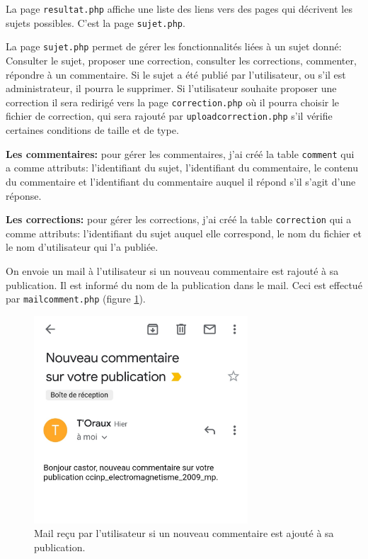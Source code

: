 \documentclass{article}
\begin{document}
La page \texttt{resultat.php} affiche une liste des liens vers des pages qui décrivent les sujets possibles. C'est la page \texttt{sujet.php}.

La page \texttt{sujet.php} permet de gérer les fonctionnalités liées à un sujet donné: Consulter le sujet, proposer une correction, consulter les corrections, commenter, répondre à un commentaire. Si le sujet a été publié par l'utilisateur, ou s'il est administrateur, il pourra le supprimer. Si l'utilisateur souhaite proposer une correction il sera redirigé vers la page \texttt{correction.php} où il pourra choisir le fichier de correction, qui sera rajouté par \texttt{uploadcorrection.php} s'il vérifie certaines conditions de taille et de type.

\textbf{Les commentaires:} pour gérer les commentaires, j'ai créé la table \texttt{comment} qui a comme attributs: l'identifiant du sujet, l'identifiant du commentaire, le contenu du commentaire et l'identifiant du commentaire auquel il répond s'il s'agit d'une réponse.

\textbf{Les corrections:} pour gérer les corrections, j'ai créé la table \texttt{correction} qui a comme attributs: l'identifiant du sujet auquel elle correspond, le nom du fichier et le nom d'utilisateur qui l'a publiée.

On envoie un mail à l'utilisateur si un nouveau commentaire est rajouté à sa publication. Il est informé du nom de la publication dans le mail. Ceci est effectué par \texttt{mailcomment.php} (figure \ref{mail}).

\begin{figure}[h]
\centering
\includegraphics[width=8cm]{mail.jpg}
\caption{Mail reçu par l'utilisateur si un nouveau commentaire est ajouté à sa publication.}
\label{mail}
\end{figure}
\end{document}
